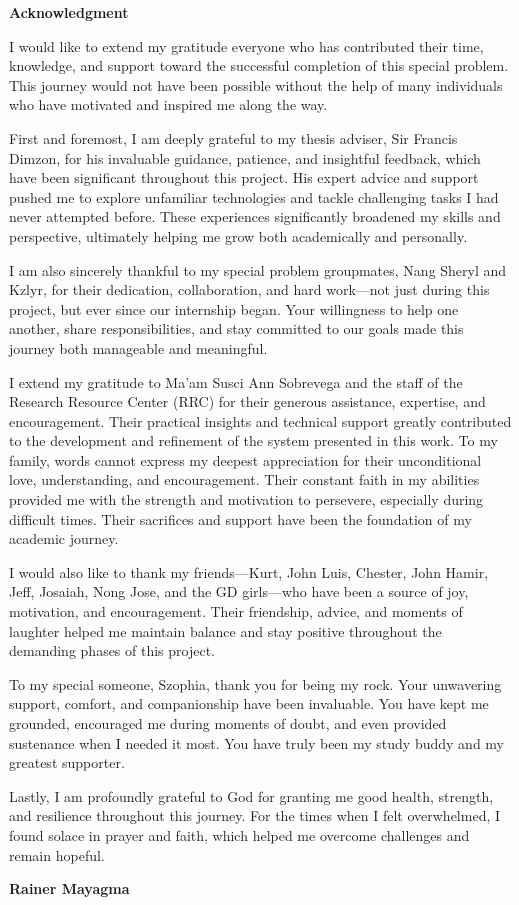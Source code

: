 \begin{center}
	\textbf{Acknowledgment}
\end{center}

I would like to extend my gratitude everyone who has contributed their time, knowledge, and support toward the successful completion of this special problem. This journey would not have been possible without the help of many individuals who have motivated and inspired me along the way.

First and foremost, I am deeply grateful to my thesis adviser, Sir Francis Dimzon, for his invaluable guidance, patience, and insightful feedback, which have been significant throughout this project. His expert advice and support pushed me to explore unfamiliar technologies and tackle challenging tasks I had never attempted before. These experiences significantly broadened my skills and perspective, ultimately helping me grow both academically and personally.

I am also sincerely thankful to my special problem groupmates, Nang Sheryl and Kzlyr, for their dedication, collaboration, and hard work—not just during this project, but ever since our internship began. Your willingness to help one another, share responsibilities, and stay committed to our goals made this journey both manageable and meaningful.

I extend my gratitude to Ma’am Susci Ann Sobrevega and the staff of the Research Resource Center (RRC) for their generous assistance, expertise, and encouragement. Their practical insights and technical support greatly contributed to the development and refinement of the system presented in this work.
To my family, words cannot express my deepest appreciation for their unconditional love, understanding, and encouragement. Their constant faith in my abilities provided me with the strength and motivation to persevere, especially during difficult times. Their sacrifices and support have been the foundation of my academic journey.

I would also like to thank my friends—Kurt, John Luis, Chester, John Hamir, Jeff, Josaiah, Nong Jose, and the GD girls—who have been a source of joy, motivation, and encouragement. Their friendship, advice, and moments of laughter helped me maintain balance and stay positive throughout the demanding phases of this project.

To my special someone, Szophia, thank you for being my rock. Your unwavering support, comfort, and companionship have been invaluable. You have kept me grounded, encouraged me during moments of doubt, and even provided sustenance when I needed it most. You have truly been my study buddy and my greatest supporter.

Lastly, I am profoundly grateful to God for granting me good health, strength, and resilience throughout this journey. For the times when I felt overwhelmed, I found solace in prayer and faith, which helped me overcome challenges and remain hopeful.

\vspace{0.5em}
\hfill \textbf{Rainer Mayagma}